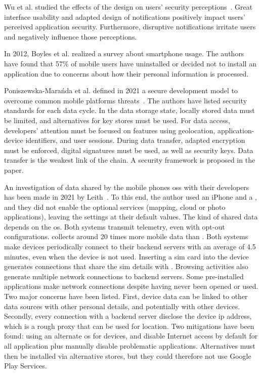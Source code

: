 Wu et al. studied the effects of the design on users' security perceptions~\cite{wu_effects_2020}. Great interface usability and adapted design of notifications positively impact users' perceived application security. Furthermore, disruptive notifications irritate users and negatively influence those perceptions. %

In 2012, Boyles et al. \cite{boyles_privacy_2012} realized a survey about smartphone usage. The authors have found that 57\% of mobile users have uninstalled or decided not to install an application due to concerns about how their personal information is processed. %

Poniszewska-Marańda et al. defined in 2021 a secure development model to overcome common mobile platforms threats~\cite{poniszewska-maranda_secure_2021}. The authors have listed security standards for each data cycle. In the data storage state, locally stored data must be limited, and alternatives for key stores must be used. For data access, developers' attention must be focused on features using geolocation, application-device identifiers, and user sessions. During data transfer, adapted encryption must be enforced, digital signatures must be used, as well as security keys. Data transfer is the weakest link of the chain. A security \gls{framework} is proposed in the paper. %

An investigation of data shared by the mobile phones \glspl{os} with their developers has been made in 2021 by Leith~\cite{garcia-alfaro_mobile_2021}. To this end, the author used an iPhone and a , and they did not enable the optional services (mapping, \gls{cloud} or photo applications), leaving the settings at their default values. The kind of shared data depends on the \gls{os}. Both systems transmit telemetry, even with opt-out configurations.  collects around 20 times more mobile data than . Both systems make devices periodically connect to their \gls{backend} servers with an average of 4.5 minutes, even when the device is not used. Inserting a \gls{sim} card into the device generates connections that share the \gls{sim} details with . Browsing activities also generate multiple network connections to \gls{backend} servers. Some pre-installed applications make network connections despite having never been opened or used. Two major concerns have been listed. First, device data can be linked to other data sources with other personal details, and potentially with other devices. Secondly, every connection with a \gls{backend} server disclose the device \gls{ip} address, which is a rough proxy that can be used for location. Two mitigations have been found: using an alternate \gls{os} for  devices, and disable Internet access by default for all application plus manually disable problematic applications. Alternatives must then be installed via alternative stores, but they could therefore not use Google Play Services. %


